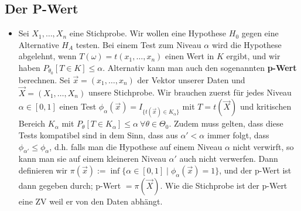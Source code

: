 \subsection{Der P-Wert}
\begin{itemize}
    \item Sei $X_1, \dots, X_n$ eine Stichprobe. Wir wollen eine Hypothese $H_0$ gegen eine Alternative $H_A$ testen. Bei einem Test zum Niveau $\alpha$ wird die Hypothese abgelehnt, wenn $T(\omega) = t(x_1, \dots, x_n)$ einen Wert in $K$ ergibt, und wir haben $P_{\theta_0} [T \in K] \le \alpha$. Alternativ kann man auch den sogenannten \textbf{p-Wert} berechnen. Sei $\overrightarrow{x} = (x_1, \dots, x_n)$ der Vektor unserer Daten und $\overrightarrow{X} = (X_1, \dots, X_n)$ unsere Stichprobe. Wir brauchen zuerst für jedes Niveau $\alpha \in [0, 1]$ einen Test $\phi_\alpha(\overrightarrow{x}) = I_{\{t(\overrightarrow{x}) \in K_\alpha\} }$ mit $T = t(\overrightarrow{X})$ und kritischen Bereich $K_\alpha$ mit $P_\theta[T \in K_\alpha] \le \alpha \ \forall \theta \in \Theta_0$. Zudem muss gelten, dass diese Tests kompatibel sind in dem Sinn, dass aus $\alpha' < \alpha$ immer folgt, dass $\phi_{\alpha'} \le \phi_\alpha$, d.h. falls man die Hypothese auf einem Niveau $\alpha$ nicht verwirft, so kann man sie auf einem kleineren Niveau $\alpha'$ auch nicht verwerfen. Dann definieren wir $\pi(\overrightarrow{x}) := \inf \{\alpha \in [0, 1] \mid \phi_\alpha(\overrightarrow{x}) = 1\}$, und der p-Wert ist dann gegeben durch; p-Wert $= \pi(\overrightarrow{X})$. Wie die Stichprobe ist der p-Wert eine ZV weil er von den Daten abhängt.
\end{itemize}
